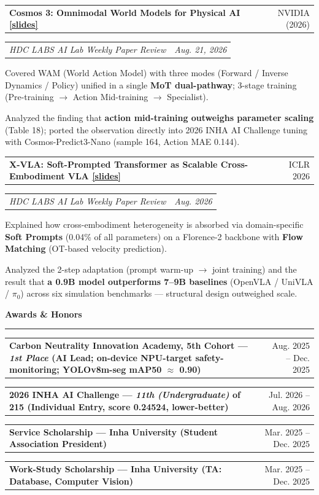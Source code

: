 \documentclass[10pt,a4paper]{article}
\makeatletter
\renewcommand{\section}[1]{%
  \par\vspace{10pt}%
  {\color{accent}\Large\bfseries #1}%
  \par\vspace{-6pt}%
  {\color{accent}\rule{\textwidth}{0.8pt}}%
  \par\vspace{4pt}%
  \@afterheading}
\newcommand{\cvEntry}[4]{%
  \par\vspace{3pt}%
  \noindent\begin{tabularx}{\textwidth}{@{}X r@{}}
    \textbf{#1} & {\color{accent}#2} \\
  \end{tabularx}\par\vspace{-4pt}%
  \noindent\begin{tabularx}{\textwidth}{@{}X r@{}}
    \textit{#3} & {\color{accent}\textit{#4}} \\
  \end{tabularx}\par}
\newcommand{\cvLine}[2]{%
  \par\vspace{2pt}%
  \noindent\begin{tabularx}{\textwidth}{@{}X r@{}}
    \textbf{#1} & {\color{accent}#2} \\
  \end{tabularx}\par}
\newenvironment{cvitems}{%
  \vspace{-2pt}%
  \begin{list}{\textbullet}{%
    \setlength{\leftmargin}{1.4em}%
    \setlength{\rightmargin}{0em}%
    \setlength{\topsep}{1pt}%
    \setlength{\itemsep}{2pt}%
    \setlength{\parsep}{0pt}%
    \setlength{\labelsep}{0.6em}}%
}{\end{list}\vspace{2pt}}
\makeatother
\begin{document}
\vspace{4pt}

\cvEntry{Cosmos 3: Omnimodal World Models for Physical AI \small \href{https://hashbraun.github.io/seminar/seminar_cosmos_nano.html}{[slides]}}{NVIDIA (2026)}{HDC LABS AI Lab Weekly Paper Review}{Aug. 21, 2026}
\begin{cvitems}
  \item Covered WAM (World Action Model) with three modes (Forward / Inverse Dynamics / Policy) unified in a single \textbf{MoT dual-pathway}; 3-stage training (Pre-training $\to$ Action Mid-training $\to$ Specialist).
  \item Analyzed the finding that \textbf{action mid-training outweighs parameter scaling} (Table 18); ported the observation directly into 2026 INHA AI Challenge tuning with Cosmos-Predict3-Nano (sample 164, Action MAE 0.144).
\end{cvitems}

\vspace{4pt}
\cvEntry{X-VLA: Soft-Prompted Transformer as Scalable Cross-Embodiment VLA \small \href{https://hashbraun.github.io/seminar/X-VLA_ICLR2026_review.pdf}{[slides]}}{ICLR 2026}{HDC LABS AI Lab Weekly Paper Review}{Aug. 2026}
\begin{cvitems}
  \item Explained how cross-embodiment heterogeneity is absorbed via domain-specific \textbf{Soft Prompts} (0.04\% of all parameters) on a Florence-2 backbone with \textbf{Flow Matching} (OT-based velocity prediction).
  \item Analyzed the 2-step adaptation (prompt warm-up $\to$ joint training) and the result that \textbf{a 0.9B model outperforms 7--9B baselines} (OpenVLA / UniVLA / $\pi_0$) across six simulation benchmarks --- structural design outweighed scale.
\end{cvitems}

\section{Awards \& Honors}
\cvLine{Carbon Neutrality Innovation Academy, 5th Cohort --- \textit{1st Place} \small (AI Lead; on-device NPU-target safety-monitoring; YOLOv8m-seg mAP50 $\approx$ 0.90)}{Aug. 2025 -- Dec. 2025}
\cvLine{2026 INHA AI Challenge --- \textit{11th (Undergraduate)} of 215 (Individual Entry, score 0.24524, lower-better)}{Jul. 2026 -- Aug. 2026}
\cvLine{Service Scholarship --- Inha University \small (Student Association President)}{Mar. 2025 -- Dec. 2025}
\cvLine{Work-Study Scholarship --- Inha University \small (TA: Database, Computer Vision)}{Mar. 2025 -- Dec. 2025}
\end{document}
